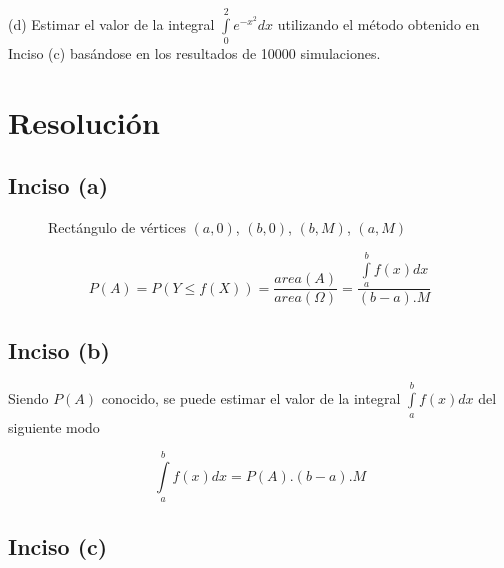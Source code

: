 \documentclass[a4paper]{article}
\begin{document}
(d) Estimar el valor de la integral $\int\limits_0^2 e^{-x^{2}} dx$ utilizando
el método obtenido en Inciso (c) basándose en los resultados de 10000
simulaciones.

\section{Resolución}
\subsection{Inciso (a)}
\begin{figure}[h]
  \centering
  \caption{Rectángulo de vértices $(a, 0)$, $(b, 0)$, $(b, M)$, $(a, M)$}
\end{figure}

\[
  P(A) = P( Y \leqslant f(X) ) = \frac{ area(A) }{ area(\Omega) } =
  \frac{ \int\limits_a^b f(x) dx }{ (b-a) . M }
\]

\subsection{Inciso (b)}

Siendo $P(A)$ conocido, se puede estimar el valor de la integral
$\int\limits_a^b f(x) dx$ del siguiente modo

\[
  \int\limits_a^b f(x) dx = P(A).(b-a) . M
\]

\subsection{Inciso (c)}


\end{document}
